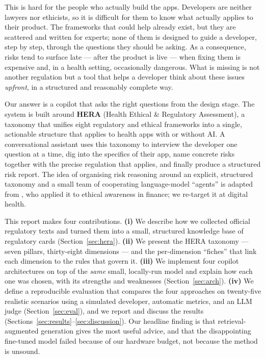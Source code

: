 \documentclass[11pt]{article}
\begin{document}
This is hard for the people who actually build the apps. Developers are neither lawyers
nor ethicists, so it is difficult for them to know what actually applies to their
product. The frameworks that could help already exist, but they are scattered and
written for experts; none of them is designed to guide a developer, step by step,
through the questions they should be asking. As a consequence, risks tend to surface
late --- after the product is live --- when fixing them is expensive and, in a health
setting, occasionally dangerous. What is missing is not another regulation but a tool
that helps a developer think about these issues \emph{upfront}, in a structured and
reasonably complete way.

Our answer is a copilot that asks the right questions from the design stage. The system
is built around \textbf{HERA} (Health Ethical \& Regulatory Assessment), a taxonomy that
unifies eight regulatory and ethical frameworks into a single, actionable structure that
applies to health apps with or without AI. A conversational assistant uses this taxonomy
to interview the developer one question at a time, dig into the specifics of their app,
name concrete risks together with the precise regulation that applies, and finally
produce a structured risk report. The idea of organising risk reasoning around an
explicit, structured taxonomy and a small team of cooperating language-model
``agents'' is adapted from \citet{deng2025ethical}, who applied it to ethical awareness
in finance; we re-target it at digital health.

This report makes four contributions. \textbf{(i)} We describe how we collected official
regulatory texts and turned them into a small, structured knowledge base of regulatory
cards (Section~\ref{sec:hera}). \textbf{(ii)} We present the HERA taxonomy --- seven
pillars, thirty-eight dimensions --- and the per-dimension ``fiches'' that link each
dimension to the rules that govern it. \textbf{(iii)} We implement four copilot
architectures on top of the \emph{same} small, locally-run model and explain how each
one was chosen, with its strengths and weaknesses (Section~\ref{sec:arch}).
\textbf{(iv)} We define a reproducible evaluation that compares the four approaches on
twenty-five realistic scenarios using a simulated developer, automatic metrics, and an
LLM judge (Section~\ref{sec:eval}), and we report and discuss the results
(Sections~\ref{sec:results}--\ref{sec:discussion}). Our headline finding is that
retrieval-augmented generation gives the most useful advice, and that the disappointing
fine-tuned model failed because of our hardware budget, not because the method is
unsound.
\end{document}
